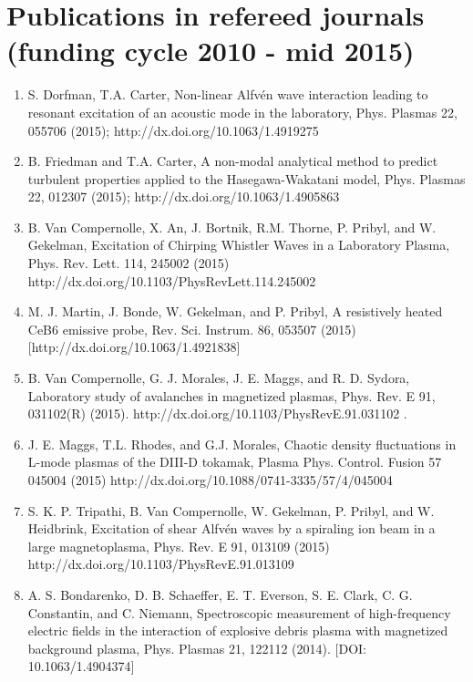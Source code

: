 \documentclass[11pt]{article}
\begin{document}
\begin{enumerate}
\end{enumerate}


\section{Publications in refereed journals (funding cycle 2010 - mid 2015)}
 \begin{enumerate}

\item S. Dorfman, T.A. Carter, Non-linear Alfv\'{e}n wave interaction
  leading to resonant excitation of an acoustic mode in the
  laboratory, Phys. Plasmas  22, 055706 (2015);
  http://dx.doi.org/10.1063/1.4919275

\item B. Friedman and T.A. Carter, A non-modal analytical method to
  predict turbulent properties applied to the Hasegawa-Wakatani model,
  Phys. Plasmas 22, 012307 (2015); http://dx.doi.org/10.1063/1.4905863

\item B. Van Compernolle, X. An, J. Bortnik, R.M. Thorne, P. Pribyl, and W. Gekelman, Excitation of Chirping Whistler Waves in a Laboratory Plasma, Phys. Rev. Lett. 114, 245002 (2015) http://dx.doi.org/10.1103/PhysRevLett.114.245002

\item M. J. Martin, J. Bonde, W. Gekelman, and P. Pribyl, A resistively heated CeB6 emissive probe, Rev. Sci. Instrum. 86, 053507 (2015) [http://dx.doi.org/10.1063/1.4921838]

\item B. Van Compernolle, G. J. Morales, J. E. Maggs, and R. D. Sydora, Laboratory study of avalanches in magnetized plasmas, Phys. Rev. E 91, 031102(R) (2015). http://dx.doi.org/10.1103/PhysRevE.91.031102 .

\item J. E. Maggs, T.L. Rhodes, and G.J. Morales, Chaotic density fluctuations in L-mode plasmas of the DIII-D tokamak, Plasma Phys. Control. Fusion 57 045004 (2015) http://dx.doi.org/10.1088/0741-3335/57/4/045004

\item S. K. P. Tripathi, B. Van Compernolle, W. Gekelman, P. Pribyl, and W. Heidbrink, Excitation of shear Alfv\'{e}n waves by a spiraling ion beam in a large magnetoplasma, Phys. Rev. E  91, 013109 (2015) http://dx.doi.org/10.1103/PhysRevE.91.013109

\item   A. S. Bondarenko, D. B. Schaeffer, E. T. Everson, S. E. Clark, C. G. Constantin, and C. Niemann, Spectroscopic measurement of high-frequency electric fields in the interaction of explosive debris plasma with magnetized background plasma, Phys. Plasmas  21, 122112 (2014). [DOI: 10.1063/1.4904374]


\end{enumerate}
\end{document}

